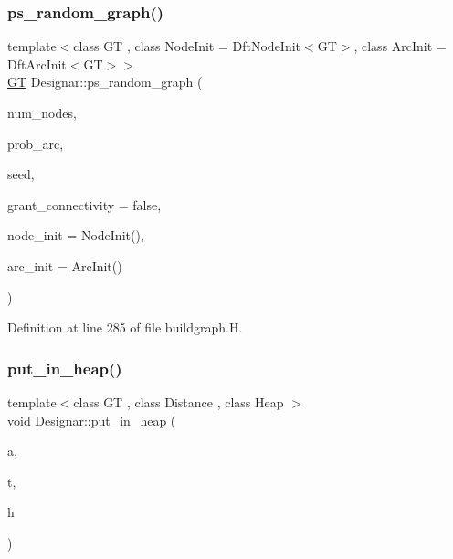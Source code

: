 \subsubsection{\texorpdfstring{ps\+\_\+random\+\_\+graph()}{ps\_random\_graph()}\hspace{0.1cm}{\footnotesize\ttfamily [2/2]}}
{\footnotesize\ttfamily template$<$class GT , class Node\+Init  = Dft\+Node\+Init$<$\+G\+T$>$, class Arc\+Init  = Dft\+Arc\+Init$<$\+G\+T$>$$>$ \\
\hyperlink{demo-buildgraph_8_c_a3001c40d2c31ca87ed96cd7d1334a55e}{GT} Designar\+::ps\+\_\+random\+\_\+graph (\begin{DoxyParamCaption}\item[{\hyperlink{namespace_designar_aa72662848b9f4815e7bf31a7cf3e33d1}{nat\+\_\+t}}]{num\+\_\+nodes,  }\item[{\hyperlink{namespace_designar_aca2c32af26808dbec1f3a3071fad25ce}{real\+\_\+t}}]{prob\+\_\+arc,  }\item[{\hyperlink{namespace_designar_ad621b5646d45288c5d6a1e1dfe7531a8}{rng\+\_\+seed\+\_\+t}}]{seed,  }\item[{bool}]{grant\+\_\+connectivity = {\ttfamily false},  }\item[{Node\+Init \&\&}]{node\+\_\+init = {\ttfamily NodeInit()},  }\item[{Arc\+Init \&\&}]{arc\+\_\+init = {\ttfamily ArcInit()} }\end{DoxyParamCaption})}



Definition at line 285 of file buildgraph.\+H.

\mbox{\label{namespace_designar_a5a953a5892c101d5207d0844b367af70}} 
\subsubsection{\texorpdfstring{put\+\_\+in\+\_\+heap()}{put\_in\_heap()}}
{\footnotesize\ttfamily template$<$class GT , class Distance , class Heap $>$ \\
void Designar\+::put\+\_\+in\+\_\+heap (\begin{DoxyParamCaption}\item[{\hyperlink{namespace_designar_a3f55fb5513d62ff47cbc8f72b8e95d6f}{Arc}$<$ \hyperlink{demo-buildgraph_8_c_a3001c40d2c31ca87ed96cd7d1334a55e}{GT} $>$ \&}]{a,  }\item[{\hyperlink{namespace_designar_a5af326c65aa2bd26b26c410f2030d09e}{Node}$<$ \hyperlink{demo-buildgraph_8_c_a3001c40d2c31ca87ed96cd7d1334a55e}{GT} $>$ \&}]{t,  }\item[{Heap \&}]{h }\end{DoxyParamCaption})}



